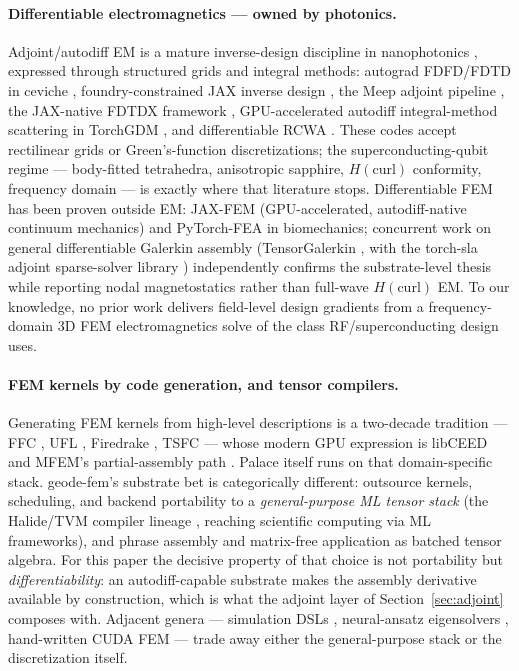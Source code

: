\documentclass{anvil-paper}
\begin{document}
\paragraph{Differentiable electromagnetics --- owned by photonics.}
Adjoint/autodiff EM is a mature inverse-design discipline in
nanophotonics \citep{molesky2018inverse}, expressed through structured
grids and integral methods: autograd FDFD/FDTD in ceviche
\citep{hughes2019forward}, foundry-constrained JAX inverse design
\citep{schubert2022inverse}, the Meep adjoint pipeline
\citep{hammond2022high}, the JAX-native FDTDX framework
\citep{mahlau2026fdtdx}, GPU-accelerated autodiff integral-method
scattering in TorchGDM \citep{ponomareva2025torchgdm}, and
differentiable RCWA \citep{kim2024meent}. These codes accept rectilinear
grids or Green's-function discretizations; the superconducting-qubit
regime --- body-fitted tetrahedra, anisotropic sapphire,
$H(\mathrm{curl})$ conformity, frequency domain --- is exactly where that
literature stops. Differentiable FEM has been proven outside EM: JAX-FEM
\citep{xue2023jax} (GPU-accelerated, autodiff-native continuum mechanics)
and PyTorch-FEA \citep{liang2023pytorch} in biomechanics; concurrent work
on general differentiable Galerkin assembly (TensorGalerkin
\citep{wen2026learning}, with the torch-sla adjoint sparse-solver library
\citep{chi2026torch}) independently confirms the substrate-level thesis
while reporting nodal magnetostatics rather than full-wave
$H(\mathrm{curl})$ EM. To our knowledge, no prior work delivers
field-level design gradients from a frequency-domain 3D FEM
electromagnetics solve of the class RF/superconducting design uses.

\paragraph{FEM kernels by code generation, and tensor compilers.}
Generating FEM kernels from high-level descriptions is a two-decade
tradition --- FFC \citep{kirby2006compiler}, UFL
\citep{alnaes2014unified}, Firedrake \citep{rathgeber2017firedrake}, TSFC
\citep{homolya2018tsfc} --- whose modern GPU expression is libCEED
\citep{brown2021libceed} and MFEM's partial-assembly path
\citep{andrej2024high}. Palace itself runs on that domain-specific stack.
geode-fem's substrate bet is categorically different: outsource kernels,
scheduling, and backend portability to a \emph{general-purpose ML tensor
stack} (the Halide/TVM compiler lineage
\citep{ragankelley2013halide,chen2018tvm}, reaching scientific computing
via ML frameworks), and phrase assembly and matrix-free application as
batched tensor algebra. For this paper the decisive property of that
choice is not portability but \emph{differentiability}: an
autodiff-capable substrate makes the assembly derivative available by
construction, which is what the adjoint layer of
Section~\ref{sec:adjoint} composes with. Adjacent genera --- simulation
DSLs \citep{hu2019difftaichi,holl2020learning}, neural-ansatz
eigensolvers \citep{jiang2024fieldtnn}, hand-written CUDA FEM
\citep{huantingmeng2014gpu} --- trade away either the general-purpose
stack or the discretization itself.
\end{document}
